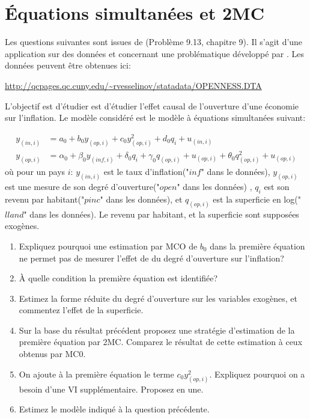 \newpage

\tableofcontents

\newpage

\section{Équations simultanées et 2MC }

Les questions suivantes sont issues de \cite{Wooldridge2010}(Problème 9.13, chapitre 9). 
Il s'agit d'une application sur des données et concernant une problématique développé par \cite{Romer1993QJE}. Les données peuvent être obtenues ici: 

\medskip

\url{http://qcpages.qc.cuny.edu/~rvesselinov/statadata/OPENNESS.DTA}

\medskip

L'objectif est d'étudier est d'étudier l'effet causal de l'ouverture d'une économie sur l'inflation. 
Le modèle considéré est le modèle à équations simultanées suivant:

\begin{align*}
	y_{(in,i)} &= a_0 + b_0 y_{(op, i)} + c_0 y_{(op, i)}^2 + d_0 q_i + u_{(in,i)}\\
	y_{(op,i)} &= \alpha_0 + \beta_0 y_{(inf, i)} + \delta_0 q_i  + \gamma_0q_{(op, i)}+ u_{(op,i)}+ \theta_0q_{(op, i)}^2+ u_{(op,i)}
\end{align*}
où pour un pays $i$: $y_{(in,i)}$ est le taux d'inflation("$inf$" dans le données), 
$y_{(op,i)}$ est une mesure de son degré d'ouverture("$open$" dans les données) , 
$q_i$ est son revenu par habitant("$pinc$" dans les données), et $q_{(op, i)}$ 
est la superficie en log("$lland$" dans les données). Le revenu par habitant, et la superficie sont supposées exogènes.

\begin{enumerate}
\item Expliquez pourquoi une estimation par MCO de $b_0$ dans la première équation ne permet pas de mesurer 
l'effet de du degré d'ouverture sur l'inflation?
\item À quelle condition la première équation est identifiée?
\item Estimez la forme réduite du degré d'ouverture sur les variables exogènes, et commentez l'effet de la superficie.
\item Sur la base du résultat précédent proposez une stratégie d'estimation de la première équation par 2MC.
 Comparez le résultat de cette estimation à ceux obtenus par MC0.  
 \item On ajoute à la première équation le terme $c_0 y_{(op, i)}^2$. Expliquez 
 pourquoi on a besoin d'une VI supplémentaire. Proposez en une.
 \item Estimez le modèle indiqué à la question précédente.
\end{enumerate}

